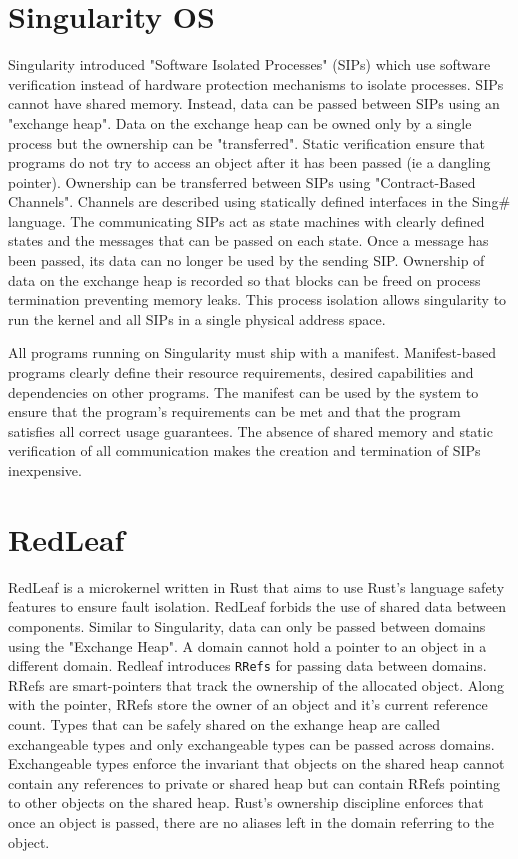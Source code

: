 
\section{Singularity OS}
Singularity\cite{singularity} introduced "Software Isolated Processes" (SIPs) which use software verification instead of hardware protection mechanisms to isolate processes. SIPs cannot have shared memory. Instead, data can be passed between SIPs using an "exchange heap". Data on the exchange heap can be owned only by a single process but the ownership can be "transferred". Static verification ensure that programs do not try to access an object after it has been passed (ie a dangling pointer). Ownership can be transferred between SIPs using "Contract-Based Channels". Channels are described using statically defined interfaces in the Sing\# language. The communicating SIPs act as state machines with clearly defined states and the messages that can be passed on each state. Once a message has been passed, its data can no longer be used by the sending SIP. Ownership of data on the exchange heap is recorded so that blocks can be freed on process termination preventing memory leaks. This process isolation allows singularity to run the kernel and all SIPs in a single physical address space.

All programs running on Singularity must ship with a manifest. Manifest-based programs clearly define their resource requirements, desired capabilities and dependencies on other programs. The manifest can be used by the system to ensure that the program's requirements can be met and that the program satisfies all correct usage guarantees. The absence of shared memory and static verification of all communication makes the creation and termination of SIPs inexpensive.

\section{RedLeaf}
RedLeaf is a microkernel written in Rust that aims to use Rust's language safety features to ensure fault isolation. RedLeaf forbids the use of shared data between components. Similar to Singularity, data can only be passed between domains using the "Exchange Heap". A domain cannot hold a pointer to an object in a different domain. Redleaf introduces \lstinline{RRefs} for passing data between domains. RRefs are smart-pointers that track the ownership of the allocated object. Along with the pointer, RRefs store the owner of an object and it's current reference count. Types that can be safely shared on the exhange heap are called exchangeable types and only exchangeable types can be passed across domains. Exchangeable types enforce the invariant that objects on the shared heap cannot contain any references to private or shared heap but can contain RRefs pointing to other objects on the shared heap. Rust's ownership discipline enforces that once an object is passed, there are no aliases left in the domain referring to the object. 

